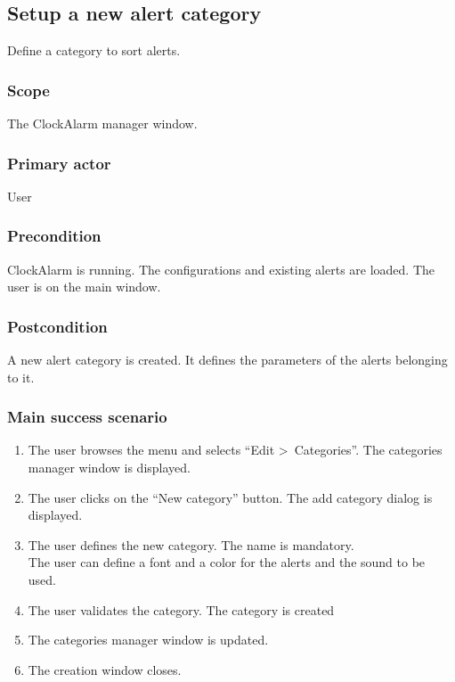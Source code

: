 \subsection{Setup a new alert category}\label{subsec:usecase_add_category}
Define a category to sort alerts.
\subsubsection{Scope}
The ClockAlarm manager window.
\subsubsection{Primary actor}
User
\subsubsection{Precondition}
ClockAlarm is running. The configurations and existing alerts are loaded. The user is on the main window.
\subsubsection{Postcondition}
A new alert category is created. It defines the parameters of the alerts belonging to it.
\subsubsection{Main success scenario}
\begin{enumerate}
	\item The user browses the menu and selects ``Edit \textgreater~Categories''. The categories manager window is displayed.
	\item The user clicks on the ``New category'' button. The add category dialog is displayed.
	\item\label{itm:ucca_enter_sc}The user defines the new category. The name is mandatory. \\The user can define a font and a color for the alerts and the sound to be used.
	\item\label{itm:ucca_validate_sc} The user validates the category. The category is created
	\item The categories manager window is updated.
	\item The creation window closes.
\end{enumerate}
